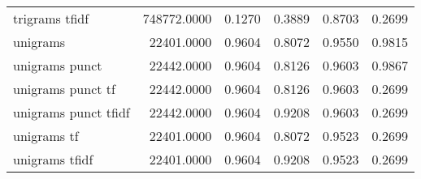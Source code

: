 \begin{tabular}{lrrrrr}
trigrams tfidf             &  748772.0000 & 0.1270 &       0.3889 &         0.8703 &               0.2699 \\
unigrams                   &   22401.0000 & 0.9604 &       0.8072 &         0.9550 &               0.9815 \\
unigrams punct             &   22442.0000 & 0.9604 &       0.8126 &         0.9603 &               0.9867 \\
unigrams punct tf          &   22442.0000 & 0.9604 &       0.8126 &         0.9603 &               0.2699 \\
unigrams punct tfidf       &   22442.0000 & 0.9604 &       0.9208 &         0.9603 &               0.2699 \\
unigrams tf                &   22401.0000 & 0.9604 &       0.8072 &         0.9523 &               0.2699 \\
unigrams tfidf             &   22401.0000 & 0.9604 &       0.9208 &         0.9523 &               0.2699 \\
\bottomrule
\end{tabular}
